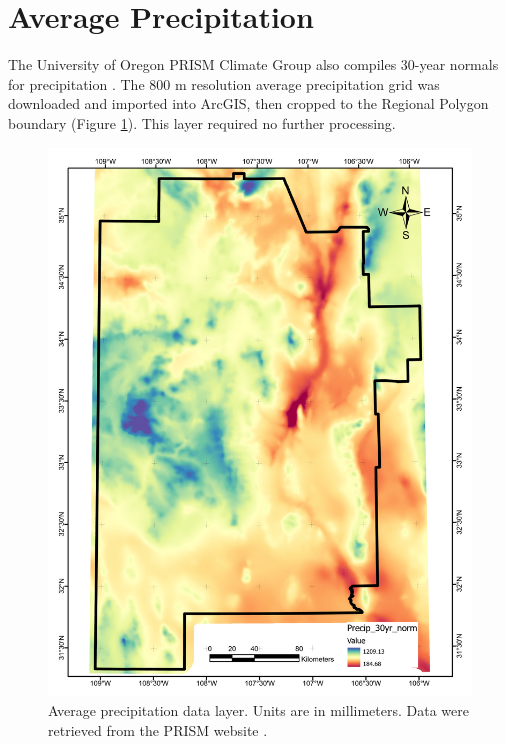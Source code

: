\section{Average Precipitation}\label{app:dl_precip}
The University of Oregon PRISM Climate Group also compiles 30-year normals for precipitation \citep{daly_physiographically_2008, prism_prism_2021}. The 800 m resolution average precipitation grid was downloaded and imported into ArcGIS, then cropped to the Regional Polygon boundary (Figure \ref{fig:feat_precip}). This layer required no further processing.

\begin{figure}[H]
\centering
\includegraphics[width=0.75\linewidth]{templates/images/Figure-AvgPrecip.pdf}
\caption[Average precipitation data layer]{Average precipitation data layer. Units are in millimeters. Data were retrieved from the PRISM website \protect\citep{prism_prism_2021}.}
\label{fig:feat_precip}
\end{figure}
\pagebreak

